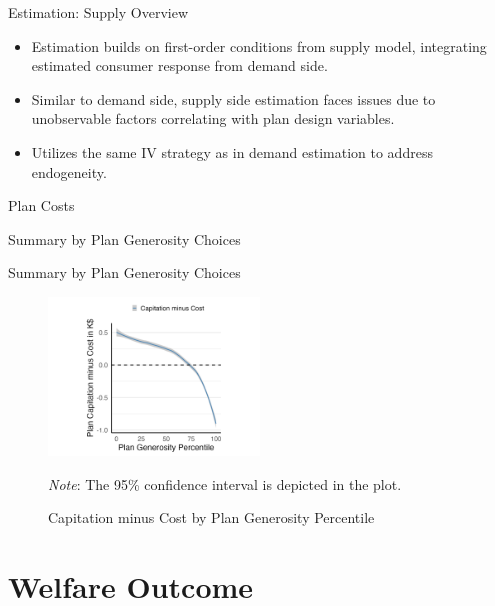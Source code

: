 \documentclass[professionalfonts, aspectratio=169]{beamer}
\begin{document}
\begin{frame}{Estimation: Supply Overview}
  \begin{itemize}
      \item Estimation builds on first-order conditions from supply model, integrating estimated consumer response from demand side.
      \item Similar to demand side, supply side estimation faces issues due to unobservable factors correlating with plan design variables.
      \item Utilizes the same IV strategy as in demand estimation to address endogeneity.
  \end{itemize}
\end{frame}

\begin{frame}{Plan Costs}
  
\end{frame}

\begin{frame}{Summary by Plan Generosity Choices}
  
\end{frame}

\begin{frame}{Summary by Plan Generosity Choices}
  \begin{figure}[htbp]
    \centering
    \includegraphics[width=0.5\textwidth]{figures/images/profit_without_premium_kernal.png}
    \caption{Capitation minus Cost by Plan Generosity Percentile}
    \label{fig:profit_without_premium_kernal}
    \vspace{0.1cm}
    \begin{minipage}{0.8\textwidth}
        \footnotesize
        \textit{Note}: The 95\% confidence interval is depicted in the plot.
    \end{minipage}
\end{figure}
\end{frame}



\section{Welfare Outcome}
\end{document}
